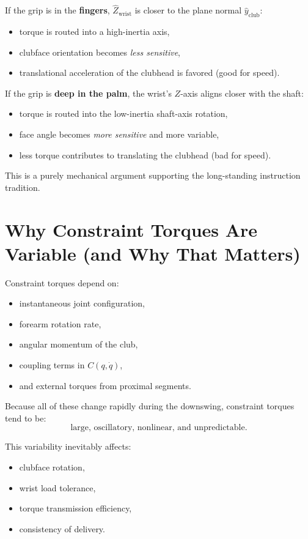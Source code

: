 \documentclass[11pt]{article}
\begin{document}
If the grip is in the \textbf{fingers}, $\hat{Z}_{\text{wrist}}$ is closer to the plane normal $\hat{y}_{\text{club}}$:
\begin{itemize}
    \item torque is routed into a high-inertia axis,
    \item clubface orientation becomes \emph{less sensitive},
    \item translational acceleration of the clubhead is favored (good for speed).
\end{itemize}

If the grip is \textbf{deep in the palm}, the wrist's $Z$-axis aligns closer with the shaft:
\begin{itemize}
    \item torque is routed into the low-inertia shaft-axis rotation,
    \item face angle becomes \emph{more sensitive} and more variable,
    \item less torque contributes to translating the clubhead (bad for speed).
\end{itemize}

This is a purely mechanical argument supporting the long-standing instruction tradition.

\section{Why Constraint Torques Are Variable (and Why That Matters)}

Constraint torques depend on:
\begin{itemize}
    \item instantaneous joint configuration,
    \item forearm rotation rate,
    \item angular momentum of the club,
    \item coupling terms in $C(q,\dot{q})$,
    \item and external torques from proximal segments.
\end{itemize}

Because all of these change rapidly during the downswing, constraint torques tend to be:
\[
\text{large, oscillatory, nonlinear, and unpredictable.}
\]

This variability inevitably affects:
\begin{itemize}
    \item clubface rotation,
    \item wrist load tolerance,
    \item torque transmission efficiency,
    \item consistency of delivery.
\end{itemize}
\end{document}
